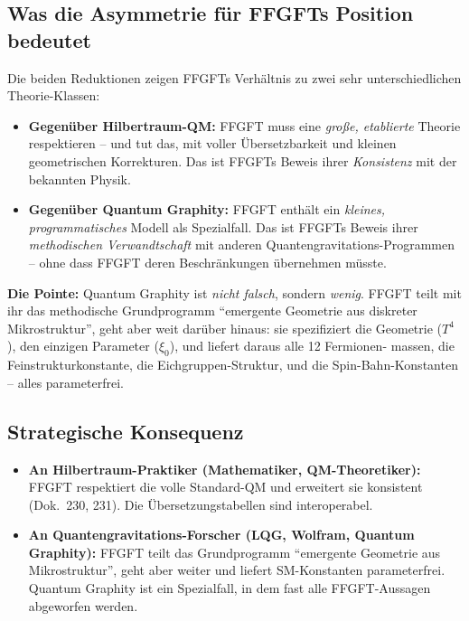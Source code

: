 \subsection{Was die Asymmetrie für FFGFTs Position bedeutet}

Die beiden Reduktionen zeigen FFGFTs Verhältnis zu zwei sehr
unterschiedlichen Theorie-Klassen:

\begin{itemize}[leftmargin=2em,itemsep=2pt,topsep=2pt]
  \item \textbf{Gegenüber Hilbertraum-QM:} FFGFT muss eine
        \emph{große, etablierte} Theorie respektieren -- und tut
        das, mit voller Übersetzbarkeit und kleinen geometrischen
        Korrekturen. Das ist FFGFTs Beweis ihrer
        \emph{Konsistenz} mit der bekannten Physik.

  \item \textbf{Gegenüber Quantum Graphity:} FFGFT enthält ein
        \emph{kleines, programmatisches} Modell als Spezialfall.
        Das ist FFGFTs Beweis ihrer \emph{methodischen Verwandtschaft}
        mit anderen Quantengravitations-Programmen -- ohne dass FFGFT
        deren Beschränkungen übernehmen müsste.
\end{itemize}

\textbf{Die Pointe:} Quantum Graphity ist \emph{nicht falsch}, sondern
\emph{wenig}. FFGFT teilt mit ihr das methodische Grundprogramm
\enquote{emergente Geometrie aus diskreter Mikrostruktur}, geht aber
weit darüber hinaus: sie spezifiziert die Geometrie ($T^4$), den
einzigen Parameter ($\xi_0$), und liefert daraus alle 12 Fermionen-
massen, die Feinstrukturkonstante, die Eichgruppen-Struktur, und die
Spin-Bahn-Konstanten -- alles parameterfrei.

\subsection{Strategische Konsequenz}

\begin{itemize}[leftmargin=2em,itemsep=2pt,topsep=2pt]
  \item \textbf{An Hilbertraum-Praktiker (Mathematiker,
        QM-Theoretiker):} FFGFT respektiert die volle Standard-QM
        und erweitert sie konsistent (Dok.~230, 231). Die
        Übersetzungstabellen sind interoperabel.

  \item \textbf{An Quantengravitations-Forscher (LQG, Wolfram,
        Quantum Graphity):} FFGFT teilt das Grundprogramm
        \enquote{emergente Geometrie aus Mikrostruktur}, geht aber
        weiter und liefert SM-Konstanten parameterfrei. Quantum
        Graphity ist ein Spezialfall, in dem fast alle FFGFT-Aussagen
        abgeworfen werden.
\end{itemize}

